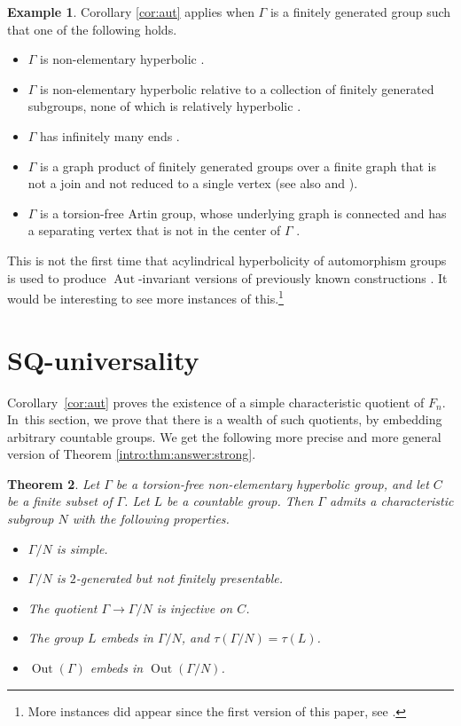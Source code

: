 \documentclass[JEP,XML,SOM,Unicode]{cedram}
\newtheorem{theorem}{Theorem}[section]
\theoremstyle{definition}
\newtheorem{example}[theorem]{Example}
\newcommand{\Aut}{\operatorname{Aut}}
\newcommand{\Out}{\operatorname{Out}}
\begin{document}
\begin{example}
\label{ex:list}
Corollary \ref{cor:aut} applies when $\Gamma$ is a finitely generated group such that one of the following holds.
\begin{itemize}
\item $\Gamma$ is non-elementary hyperbolic \cite{auto:oneend, auto:infend}.
\item $\Gamma$ is non-elementary hyperbolic relative to a collection of finitely generated subgroups, none of which is relatively hyperbolic \cite[Th.\,1.3]{auto:infend}.
\item $\Gamma$ has infinitely many ends \cite[Th.\,1.1]{auto:infend}.
\item $\Gamma$ is a graph product of finitely generated groups over a finite graph that is not a join and not reduced to a single vertex \cite[Th.\,A.27]{escalierhorbez} (see also \cite[Th.\,E]{auto:graph1} and \cite[Th.\,1.5]{auto:graph2}).
\item $\Gamma$ is a torsion-free Artin group, whose underlying graph is connected and has a separating vertex that is not in the center of $\Gamma$ \cite[Th.\,E]{auto:artin}.
\end{itemize}
This is not the first time that acylindrical hyperbolicity of automorphism groups is used to produce $\Aut$-invariant versions of previously known constructions \cite{osin:aut, ffw}. It would be interesting to see more instances of this.\footnote{More instances did appear since the first version of this paper, see \cite{fff:separable, rinfty}.}
\end{example}

\section{SQ-universality}

Corollary~\ref{cor:aut} proves the existence of a simple characteristic quotient of $F_n$. In~this section, we prove that there is a wealth of such quotients, by embedding arbitrary countable groups. We get the following more precise and more general version of Theorem \ref{intro:thm:answer:strong}.

\begin{theorem}
\label{thm:answer}
Let $\Gamma$ be a torsion-free non-elementary hyperbolic group, and let $C$ be a finite subset of $\Gamma$.
Let $L$ be a countable group.
Then $\Gamma$ admits a characteristic subgroup $N$ with the following properties.
\begin{itemize}
\item $\Gamma / N$ is simple.
\item $\Gamma / N$ is $2$-generated but not finitely presentable.
\item The quotient $\Gamma \to \Gamma / N$ is injective on $C$.
\item The group $L$ embeds in $\Gamma / N$, and $\tau(\Gamma / N) = \tau(L)$.
\item $\Out(\Gamma)$ embeds in $\Out(\Gamma / N)$.
\end{itemize}
\end{theorem}
\end{document}
